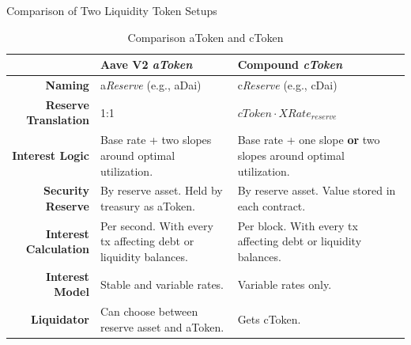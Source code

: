 \documentclass[]{beamer}
\begin{document}
\begin{frame}{Comparison of Two Liquidity Token Setups}

\footnotesize
\begin{table}
  \center
  \begin{tabularx}{\textwidth}{rXX}
    \toprule
    ~	& \textbf{Aave V2} \emph{aToken} & \textbf{Compound} \emph{cToken}	\\
    \midrule
    \textbf{Naming} & a\textit{Reserve} (e.g., aDai) & c\textit{Reserve} (e.g., cDai) \vspace{0.5em}\\
    \textbf{Reserve Translation} & 1:1 & $cToken \cdot XRate_{reserve}$ \vspace{0.5em}\\
    \textbf{Interest Logic} & Base rate + two slopes around optimal utilization. & Base rate + one slope \textbf{or} two slopes around optimal utilization. \vspace{0.5em}\\
    \textbf{Security Reserve} & By reserve asset. Held by treasury as aToken. & By reserve asset. Value stored in each contract. \vspace{0.5em}\\
    \textbf{Interest Calculation} & Per second. With every tx affecting debt or liquidity balances. & Per block. With every tx affecting debt or liquidity balances. \vspace{0.5em}\\
    \textbf{Interest Model} & Stable and variable rates. & Variable rates only. \vspace{0.5em}\\
    \textbf{Liquidator} & Can choose between reserve asset and aToken. & Gets cToken.\\
    \bottomrule
  \end{tabularx}
  \caption{Comparison aToken and cToken \cite{AaveV2,Compound}}
\end{table}

\end{frame}
\end{document}
